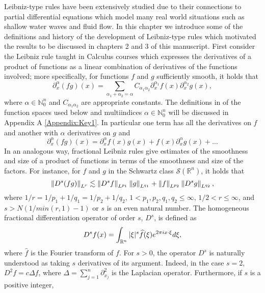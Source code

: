 Leibniz-type rules have been extensively studied due to their connections to partial differential equations which model many real world situations such as shallow water waves and fluid flow. In this chapter we introduce some of the definitions and history of the development of Leibniz-type rules which motivated the results to be discussed in chapters 2 and 3 of this manuscript. First consider the Leibniz rule taught in Calculus courses which expresses the derivatives of a product of functions as a linear combination of derivatives of the functions involved; more specifically, for functions $f$ and $g$ sufficiently smooth, it holds that
\[\partial^\alpha_x (fg)(x) = \sum_{\alpha_1 + \alpha_2 = \alpha} C_{\alpha_1 \alpha_2} \partial^{\alpha_1}_x f(x) \partial^{\alpha_2}_x g(x),\]
where $\alpha \in \mathbb{N}^n_0$ and $C_{\alpha_1 \alpha_2}$ are appropriate constants. The definitions in of the function spaces used below and multiindices $\alpha\in\mathbb{N}^n_0$ will be discussed in Appendix A \ref{Appendix:Key1}. In particular one term has all the derivatives on $f$ and another with $\alpha$ derivatives on $g$ and
\[ \partial^\alpha_x (fg)(x) = \partial^\alpha_x f(x) g(x) + f(x) \partial^\alpha_x g(x) + ...\]
In an analogous way, fractional Leibniz rules give estimates of the smoothness and size of a product of functions in terms of the smoothness and size of the factors. For instance, for $f$ and $g$ in the Schwartz class $\mathcal{S}(\mathbb{R}^n)$, it holds that
\begin{equation}\label{def:leibniz}
\left\|D^s (fg)\right\|_{L^r} \lesssim \left\|D^s f\right\|_{L^{p_1}}\left\|g\right\|_{L^{q_1}} + \left\|f\right\|_{L^{p_2}}\left\|D^s g\right\|_{L^{q_2}},
\end{equation}
where $1/r = 1/p_1 + 1/q_1 = 1/p_2 + 1/q_2$, $1<p_1,p_2,q_1,q_2\leq \infty$, $1/2 <r\leq \infty$, and $s>N(1/min(r,1) - 1)$ or $s$ is an even natural number. The homogeneous fractional differentiation operator of order $s$, $D^s$, is defined as \[D^s f(x) = \int_{{\mathbb R}^n} |\xi|^s \widehat{f}(\xi) e^{2\pi i x\cdot \xi} d\xi,\]
where $\widehat{f}$ is the Fourier transform of $f$.
For $s>0$, the operator $D^s$ is naturally understood as taking $s$ derivatives of its argument. Indeed, in the case $s=2$, $D^2f = c\Delta f$, where $\Delta = \sum_{j=1}^n \partial^2_{x_j}$ is the Laplacian operator. Furthermore, if $s$ is a positive integer,


